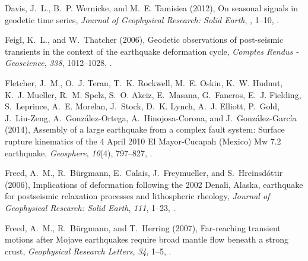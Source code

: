 \documentclass[draft,linenumbers]{AGUJournal}
\providecommand{\DIFadd}[1]{{\protect\color{blue}\uwave{#1}}} %
\providecommand{\DIFaddbegin}{} %
\providecommand{\DIFaddend}{} %
\providecommand{\DIFdelbegin}{} %
\providecommand{\DIFdelend}{} %
\begin{document}
\begin{thebibliography}{52}
Davis, J.~L., B.~P. Wernicke, and M.~E. Tamisiea (2012), {On seasonal signals in geodetic time series}, \textit{Journal of Geophysical Research: Solid Earth}, \DIFdelbegin %
\DIFdelend \DIFaddbegin \textit{\DIFadd{117}}\DIFadd{(B01403)}\DIFaddend , 1--10, .

Feigl, K.~L., and W.~Thatcher (2006), {Geodetic observations of post-seismic transients in the context of the earthquake deformation cycle}, \textit{Comptes Rendus - Geoscience}, \textit{338}, 1012--1028, .

Fletcher, J.~M., O.~J. Teran, T.~K. Rockwell, M.~E. Oskin, K.~W. Hudnut, K.~J. Mueller, R.~M. Spelz, S.~O. Akciz, E.~Masana, G.~Faneros, E.~J. Fielding, S.~Leprince, A.~E. Morelan, J.~Stock, D.~K. Lynch, A.~J. Elliott, P.~Gold, J.~Liu-Zeng, A.~Gonz{\'{a}}lez-Ortega, A.~Hinojosa-Corona, and J.~Gonz{\'{a}}lez-Garc{\'{i}}a (2014), {Assembly of a large earthquake from a complex fault system: Surface rupture kinematics of the 4 April 2010 El Mayor-Cucapah (Mexico) Mw 7.2 earthquake}, \textit{Geosphere}, \textit{10}(4), 797--827, .

Freed, A.~M., R.~B{\"{u}}rgmann, E.~Calais, J.~Freymueller, and S.~Hreinsd{\'{o}}ttir (2006), {Implications of deformation following the 2002 Denali, Alaska, earthquake for postseismic relaxation processes and lithospheric rheology}, \textit{Journal of Geophysical Research: Solid Earth}, \textit{111}\DIFaddbegin \DIFadd{(B01401)}\DIFaddend , 1--23, .

Freed, A.~M., R.~B{\"{u}}rgmann, and T.~Herring (2007), {Far-reaching transient motions after Mojave earthquakes require broad mantle flow beneath a strong crust}, \textit{Geophysical Research Letters}, \textit{34}\DIFaddbegin \DIFadd{(L19302)}\DIFaddend , 1--5, .


\end{thebibliography}
\end{document}

